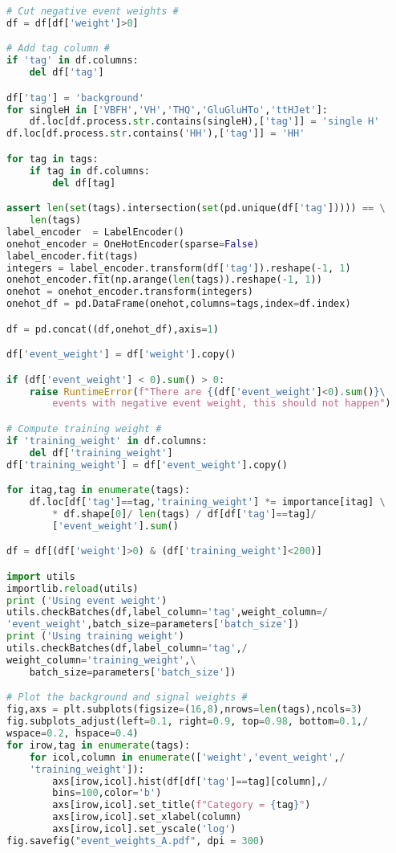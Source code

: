 \begin{lstlisting}[language=Python, caption=DNN setup for the \wwgg semi-leptonic final state, label={dnncode}]
# Cut negative event weights #
df = df[df['weight']>0]

# Add tag column #
if 'tag' in df.columns:
    del df['tag']

df['tag'] = 'background'
for singleH in ['VBFH','VH','THQ','GluGluHTo','ttHJet']:
    df.loc[df.process.str.contains(singleH),['tag']] = 'single H'
df.loc[df.process.str.contains('HH'),['tag']] = 'HH'

for tag in tags:
    if tag in df.columns:
        del df[tag]

assert len(set(tags).intersection(set(pd.unique(df['tag'])))) == \
    len(tags)
label_encoder  = LabelEncoder()
onehot_encoder = OneHotEncoder(sparse=False)
label_encoder.fit(tags)
integers = label_encoder.transform(df['tag']).reshape(-1, 1)
onehot_encoder.fit(np.arange(len(tags)).reshape(-1, 1))
onehot = onehot_encoder.transform(integers)
onehot_df = pd.DataFrame(onehot,columns=tags,index=df.index)

df = pd.concat((df,onehot_df),axis=1)

df['event_weight'] = df['weight'].copy()

if (df['event_weight'] < 0).sum() > 0:
    raise RuntimeError(f"There are {(df['event_weight']<0).sum()}\
        events with negative event weight, this should not happen")

# Compute training weight #
if 'training_weight' in df.columns:
    del df['training_weight']
df['training_weight'] = df['event_weight'].copy()

for itag,tag in enumerate(tags):
    df.loc[df['tag']==tag,'training_weight'] *= importance[itag] \
        * df.shape[0]/ len(tags) / df[df['tag']==tag]/
        ['event_weight'].sum()

df = df[(df['weight']>0) & (df['training_weight']<200)]

import utils
importlib.reload(utils)
print ('Using event weight')
utils.checkBatches(df,label_column='tag',weight_column=/
'event_weight',batch_size=parameters['batch_size'])
print ('Using training weight')
utils.checkBatches(df,label_column='tag',/
weight_column='training_weight',\
    batch_size=parameters['batch_size'])

# Plot the background and signal weights #
fig,axs = plt.subplots(figsize=(16,8),nrows=len(tags),ncols=3)
fig.subplots_adjust(left=0.1, right=0.9, top=0.98, bottom=0.1,/
wspace=0.2, hspace=0.4)
for irow,tag in enumerate(tags):
    for icol,column in enumerate(['weight','event_weight',/
    'training_weight']):
        axs[irow,icol].hist(df[df['tag']==tag][column],/
        bins=100,color='b')
        axs[irow,icol].set_title(f"Category = {tag}")
        axs[irow,icol].set_xlabel(column)
        axs[irow,icol].set_yscale('log')
fig.savefig("event_weights_A.pdf", dpi = 300)


\end{lstlisting}
